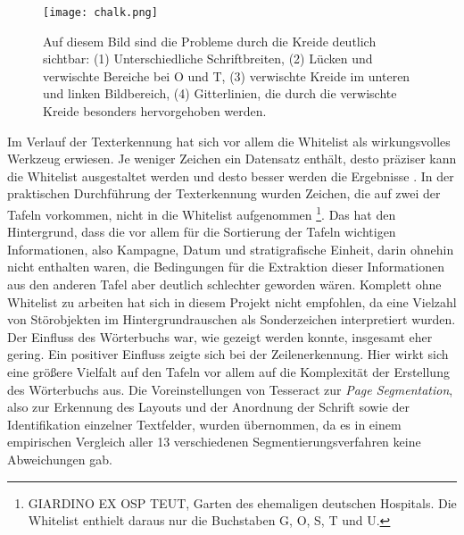 \begin{figure}[h!]
\centering
\texttt{[image: chalk.png]}
\caption{Auf diesem Bild sind die Probleme durch die Kreide deutlich sichtbar: (1) Unterschiedliche Schriftbreiten, (2) Lücken und verwischte Bereiche bei O und T, (3) verwischte Kreide im unteren und linken Bildbereich, (4) Gitterlinien, die durch die verwischte Kreide besonders hervorgehoben werden.}
\label{fig:kreide}
\end{figure}
Im Verlauf der Texterkennung hat sich vor allem die Whitelist als wirkungsvolles Werkzeug erwiesen. Je weniger Zeichen ein Datensatz enthält, desto präziser kann die Whitelist ausgestaltet werden und desto besser werden die Ergebnisse \cite[p.~107]{feldmann}. In der praktischen Durchführung der Texterkennung wurden Zeichen, die auf zwei der Tafeln vorkommen, nicht in die Whitelist aufgenommen \footnote{\glqq GIARDINO EX OSP TEUT\grqq, Garten des ehemaligen deutschen Hospitals. Die Whitelist enthielt daraus nur die Buchstaben G, O, S, T und U.}. Das hat den Hintergrund, dass die vor allem für die Sortierung der Tafeln wichtigen Informationen, also Kampagne, Datum und stratigrafische Einheit, darin ohnehin nicht enthalten waren, die Bedingungen für die Extraktion dieser Informationen aus den anderen Tafel aber deutlich schlechter geworden wären.
Komplett ohne Whitelist zu arbeiten hat sich in diesem Projekt nicht empfohlen, da eine Vielzahl von Störobjekten im Hintergrundrauschen als Sonderzeichen interpretiert wurden.
Der Einfluss des Wörterbuchs war, wie gezeigt werden konnte, insgesamt eher gering. Ein positiver Einfluss zeigte sich bei der Zeilenerkennung. Hier wirkt sich eine größere Vielfalt auf den Tafeln vor allem auf die Komplexität der Erstellung des Wörterbuchs aus.
Die Voreinstellungen von Tesseract zur \textit{Page Segmentation}, also zur Erkennung des Layouts und der Anordnung der Schrift sowie der Identifikation einzelner Textfelder, wurden übernommen, da es in einem empirischen Vergleich aller 13 verschiedenen Segmentierungsverfahren keine Abweichungen gab.
